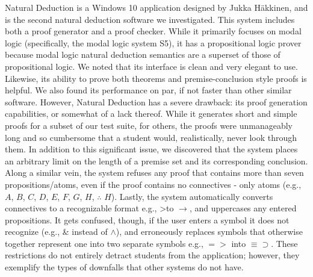 \documentclass[ms]{uncgdissertationexp2}
\theoremstyle{plain}
\theoremstyle{definition}
\theoremstyle{remark}
\begin{document}
Natural Deduction is a Windows 10 application designed by Jukka H\"akkinen, and is the second natural deduction software we investigated. This system includes both a proof generator and a proof checker. While it primarily focuses on modal logic (specifically, the modal logic system S5), it has a propositional logic prover because modal logic natural deduction semantics are a superset of those of propositional logic. We noted that its interface is clean and very elegant to use. Likewise, its ability to prove both theorems and premise-conclusion style proofs is helpful. We also found its performance on par, if not faster than other similar software. However, Natural Deduction has a severe drawback: its proof generation capabilities, or somewhat of a lack thereof. While it generates short and simple proofs for a subset of our test suite, for others, the proofs were unmanageably long and so cumbersome that a student would, realistically, never look through them. In addition to this significant issue, we discovered that the system places an arbitrary limit on the length of a premise set and its corresponding conclusion. Along a similar vein, the system refuses any proof that contains more than seven propositions/atoms, even if the proof contains no connectives - only atoms (e.g., $A$, $B$, $C$, $D$, $E$, $F$, $G$, $H$, $\therefore$ $H$). Lastly, the system automatically converts connectives to a recognizable format e.g., \textgreater\;to $\to$, and uppercases any entered propositions. It gets confused, though, if the user enters a symbol it does not recognize (e.g., \& instead of $\land$), and erroneously replaces symbols that otherwise together represent one into two separate symbols e.g., $=>$ into $\equiv\supset$. These restrictions do not entirely detract students from the application; however, they exemplify the types of downfalls that other systems do not have.
\end{document}
